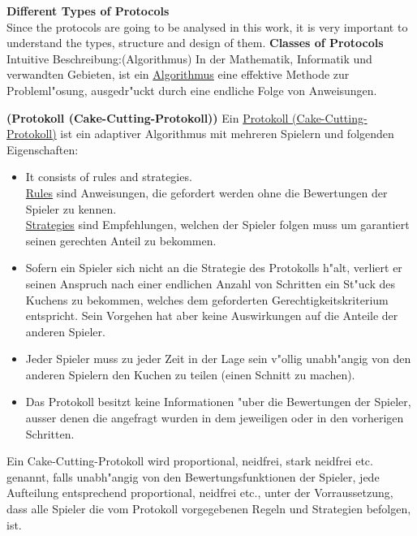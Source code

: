 \newpage
\textbf{Different Types of Protocols}\\
\newline
Since the protocols are going to be analysed in this work, it is very important to understand the types, structure and design of them.
\textbf{Classes of Protocols}\\
\newline
Intuitive Beschreibung:(Algorithmus)
\newline In der Mathematik, Informatik und verwandten Gebieten, ist ein
\underline{Algorithmus} eine effektive Methode zur Probleml"osung, ausgedr"uckt
durch eine endliche Folge von Anweisungen.
\begin{defi}{\textbf{(Protokoll (Cake-Cutting-Protokoll))}}
\newline Ein \underline{Protokoll (Cake-Cutting-Protokoll)} ist ein adaptiver
Algorithmus mit mehreren Spielern und folgenden Eigenschaften:
\begin{itemize}
\item{It consists of rules and strategies.\\ \underline{Rules} sind
Anweisungen, die gefordert werden ohne die Bewertungen der Spieler zu kennen.\\
\underline{Strategies} sind Empfehlungen, welchen der Spieler folgen muss um
garantiert seinen gerechten Anteil zu bekommen.
}
\item{Sofern ein Spieler sich nicht an die Strategie des Protokolls h"alt,
verliert er seinen Anspruch nach einer endlichen Anzahl von Schritten ein St"uck
des Kuchens zu bekommen, welches dem geforderten Gerechtigkeitskriterium
entspricht. Sein Vorgehen hat aber keine Auswirkungen auf die Anteile der
anderen Spieler.}
\item Jeder Spieler muss zu jeder Zeit in der Lage sein v"ollig unabh"angig von
den anderen Spielern den Kuchen zu teilen (einen Schnitt zu machen).
\item Das Protokoll besitzt keine Informationen "uber die Bewertungen der
Spieler, ausser denen die angefragt wurden in dem jeweiligen oder in den
vorherigen Schritten.
\end{itemize}
\end{defi}
\begin{defi}
Ein Cake-Cutting-Protokoll wird proportional, neidfrei, stark neidfrei etc.
genannt, falls unabh"angig von den Bewertungsfunktionen der Spieler, jede
Aufteilung entsprechend proportional, neidfrei etc., unter der Vorraussetzung,
dass alle Spieler die vom Protokoll vorgegebenen Regeln und Strategien befolgen,
ist.
\end{defi}
